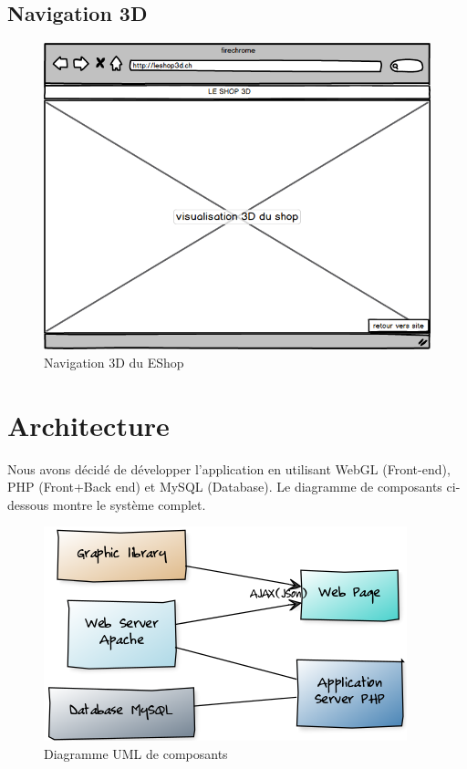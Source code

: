\documentclass[12pt]{article}
\begin{document}
\subsection{Navigation 3D}

\begin{figure}[ht]
    \center
    \includegraphics[scale=0.6]{../Maquettes/nav_3D.jpeg}
    \caption*{Navigation 3D du EShop}
\end{figure}


\newpage
\section{Architecture}
Nous avons décidé de développer l'application en utilisant WebGL (Front-end), PHP (Front+Back end) et MySQL (Database).
Le diagramme de composants ci-dessous montre le système complet.
\begin{figure}[ht]
    \center
    \includegraphics[scale=0.6]{../Diagrams/ComposantDiagrams/composants.png}
    \caption*{Diagramme UML de composants}
\end{figure}
\end{document}

